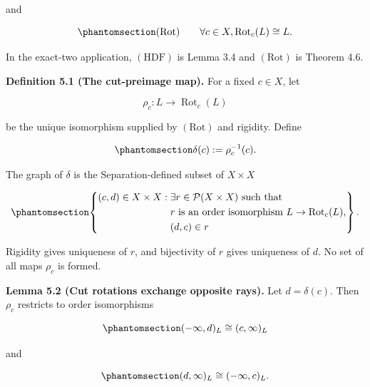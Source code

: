 \documentclass[
  english,
  11pt,
  reqno]{amsart}
\begin{document}
and

\begin{equation}\protect\phantomsection\label{eq:rotation-hypothesis}{
(\mathrm{Rot})
\qquad
\forall c\in X,
\operatorname{Rot}_c(L)\cong L.
}\end{equation}

In the exact-two application, \((\mathrm{HDF})\) is Lemma 3.4 and
\((\mathrm{Rot})\) is Theorem 4.6.

\protect{}\label{def:5-1-cut-preimage}

\textbf{Definition 5.1 (The cut-preimage map).} For a fixed \(c\in X\),
let

\[
\rho_c:
L
\longrightarrow
\operatorname{Rot}_c(L)
\]

be the unique isomorphism supplied by \((\mathrm{Rot})\) and rigidity.
Define

\begin{equation}\protect\phantomsection\label{eq:cut-preimage}{
\delta(c):=\rho_c^{-1}(c).
}\end{equation}

The graph of \(\delta\) is the Separation-defined subset of
\(X\times X\)

\begin{equation}\protect\phantomsection\label{eq:cut-preimage-graph}{
\left\{
\begin{aligned}
(c,d)\in X\times X:\;&
\exists r\in\mathcal P(X\times X)\ \text{such that}\\
&r\text{ is an order isomorphism }L\to\operatorname{Rot}_c(L),\\
&(d,c)\in r
\end{aligned}
\right\}.
}\end{equation}

Rigidity gives uniqueness of \(r\), and bijectivity of \(r\) gives
uniqueness of \(d\). No set of all maps \(\rho_c\) is formed.

\protect{}\label{lem:5-2-ray-exchange}

\textbf{Lemma 5.2 (Cut rotations exchange opposite rays).} Let
\(d=\delta(c)\). Then \(\rho_c\) restricts to order isomorphisms

\begin{equation}\protect\phantomsection\label{eq:left-to-right-ray}{
(-\infty,d)_L
\cong
(c,\infty)_L
}\end{equation}

and

\begin{equation}\protect\phantomsection\label{eq:right-to-left-ray}{
(d,\infty)_L
\cong
(-\infty,c)_L.
}\end{equation}
\end{document}
